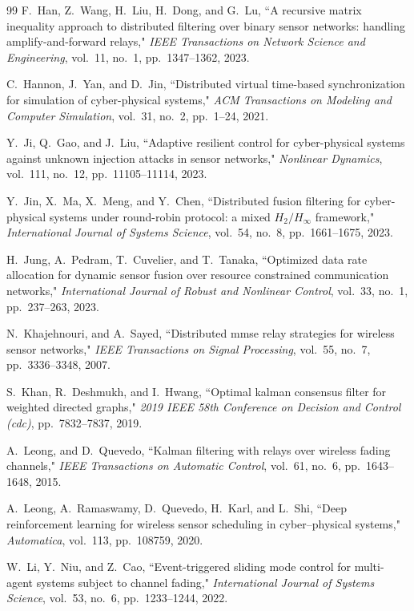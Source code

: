 \documentclass[twocolumn]{IEEEtran}
\begin{document}
\begin{thebibliography}{99}
F.~Han, Z.~Wang, H.~Liu, H.~Dong, and G.~Lu, ``A recursive matrix inequality approach to distributed filtering over binary sensor networks: handling amplify-and-forward relays," \textit{IEEE Transactions on Network Science and Engineering}, vol.~11, no.~1, pp.~1347--1362, 2023.

C.~Hannon, J.~Yan, and D.~Jin, ``Distributed virtual time-based synchronization for simulation of cyber-physical systems," \textit{ACM Transactions on Modeling and Computer Simulation}, vol.~31, no.~2, pp.~1--24, 2021.

Y.~Ji, Q.~Gao, and J.~Liu, ``Adaptive resilient control for cyber-physical systems against unknown injection attacks in sensor networks," \textit{Nonlinear Dynamics}, vol.~111, no.~12, pp.~11105--11114, 2023.

Y.~Jin, X.~Ma, X.~Meng, and Y.~Chen, ``Distributed fusion filtering for cyber-physical systems under round-robin protocol: a mixed $H_2/H_{\infty}$ framework," \textit{International Journal of Systems Science}, vol.~54, no.~8, pp.~1661--1675, 2023.

H.~Jung, A.~Pedram, T.~Cuvelier, and T.~Tanaka, ``Optimized data rate allocation for dynamic sensor fusion over resource constrained communication networks," \textit{International Journal of Robust and Nonlinear Control}, vol.~33, no.~1, pp.~237--263, 2023.

N.~Khajehnouri, and A.~Sayed, ``Distributed mmse relay strategies for wireless sensor networks," \textit{IEEE Transactions on Signal Processing}, vol.~55, no.~7, pp.~3336--3348, 2007.

S.~Khan, R.~Deshmukh, and I.~Hwang, ``Optimal kalman consensus filter for weighted directed graphs," \textit{2019 IEEE 58th Conference on Decision and Control (cdc)}, pp.~7832--7837, 2019.

A.~Leong, and D.~Quevedo, ``Kalman filtering with relays over wireless fading channels," \textit{IEEE Transactions on Automatic Control}, vol.~61, no.~6, pp.~1643--1648, 2015.

A.~Leong, A.~Ramaswamy, D.~Quevedo, H.~Karl, and L.~Shi, ``Deep reinforcement learning for wireless sensor scheduling in cyber--physical systems," \textit{Automatica}, vol.~113, pp.~108759, 2020.

W.~Li, Y.~Niu, and Z.~Cao, ``Event-triggered sliding mode control for multi-agent systems subject to channel fading," \textit{International Journal of Systems Science}, vol.~53, no.~6, pp.~1233--1244, 2022.


\end{thebibliography}
\end{document}
